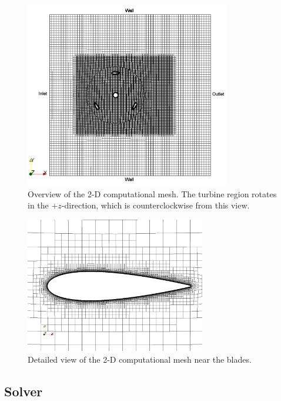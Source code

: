 \documentclass[aip,graphicx]{revtex4-1}
\begin{document}
\begin{figure}
    \centering

    \includegraphics[width=0.8\textwidth]{2D_mesh}

    \caption{Overview of the 2-D computational mesh. The turbine region rotates
    in the $+z$-direction, which is counterclockwise from this view.}

    \label{fig:2d-br-mesh}
\end{figure}


\begin{figure}
    \centering

    \includegraphics[width=0.7\textwidth]{2D_blade_mesh_closeup}

    \caption{Detailed view of the 2-D computational mesh near the blades.}

    \label{fig:blade-mesh}
\end{figure}


\subsection{Solver}
\end{document}
